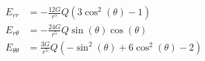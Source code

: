 \documentclass{article}
\begin{document}
 
\addtocounter{equation}{4}
\begin{align}
    E_{rr} &= - \frac{12 G}{r^{5}} Q \left(3 \cos^{2}{\left (\theta \right )} - 1\right) \\
    E_{r\theta} &= - \frac{24 G}{r^{5}} Q \sin{\left (\theta \right )} \cos{\left (\theta \right )} \\
    E_{\theta\theta} &= \frac{3 G}{r^{5}} Q \left(- \sin^{2}{\left (\theta \right )} + 6 \cos^{2}{\left (\theta \right )} - 2\right)
\end{align}
\end{document}
